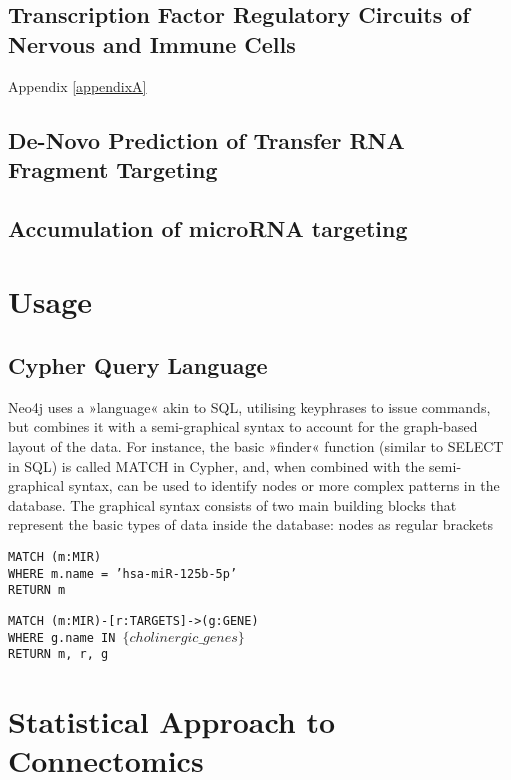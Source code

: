 \subsection{Transcription Factor Regulatory Circuits of Nervous and Immune Cells}
Appendix \ref{appendixA}

\subsection{De-Novo Prediction of Transfer RNA Fragment Targeting}

\subsection{Accumulation of microRNA targeting}

\section{Usage}
\subsection{Cypher Query Language}
Neo4j uses a »language« akin to SQL, utilising keyphrases to issue commands, but combines it with a semi-graphical syntax to account for the graph-based layout of the data. For instance, the basic »finder« function (similar to SELECT in SQL) is called MATCH in Cypher, and, when combined with the semi-graphical syntax, can be used to identify nodes or more complex patterns in the database. The graphical syntax consists of two main building blocks that represent the basic types of data inside the database: nodes as regular brackets%

\texttt{MATCH (m:MIR)\\WHERE m.name = 'hsa-miR-125b-5p'\\RETURN m}

\texttt{MATCH (m:MIR)-[r:TARGETS]->(g:GENE)\\
WHERE g.name IN $\{ cholinergic\_genes \}$\\
RETURN m, r, g}

\section{Statistical Approach to Connectomics}

